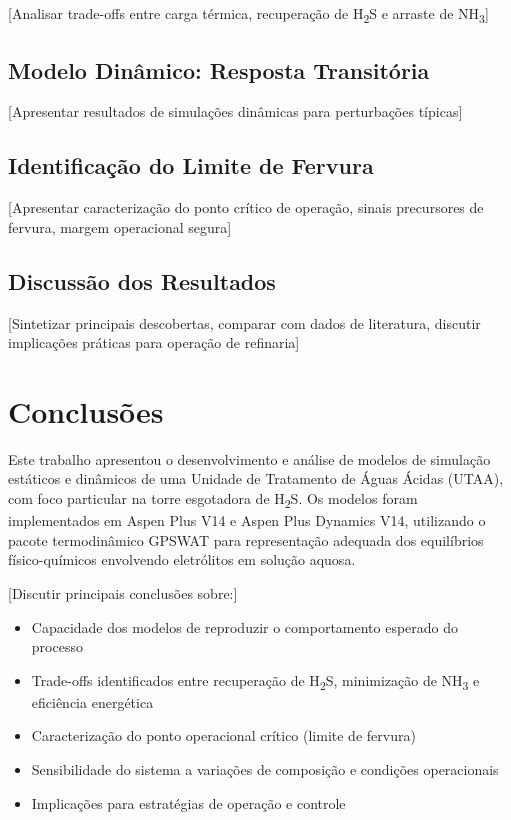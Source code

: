 [Analisar trade-offs entre carga térmica, recuperação de H\textsubscript{2}S e arraste de NH\textsubscript{3}]

\subsection{Modelo Dinâmico: Resposta Transitória}

[Apresentar resultados de simulações dinâmicas para perturbações típicas]


\subsection{Identificação do Limite de Fervura}

[Apresentar caracterização do ponto crítico de operação, sinais precursores de fervura, margem operacional segura]

\subsection{Discussão dos Resultados}

[Sintetizar principais descobertas, comparar com dados de literatura, discutir implicações práticas para operação de refinaria]

\FloatBarrier

\section{Conclusões}\label{sec:conclusoes}


Este trabalho apresentou o desenvolvimento e análise de modelos de simulação estáticos e dinâmicos de uma Unidade de Tratamento de Águas Ácidas (UTAA), com foco particular na torre esgotadora de H\textsubscript{2}S. Os modelos foram implementados em Aspen Plus V14 e Aspen Plus Dynamics V14, utilizando o pacote termodinâmico GPSWAT para representação adequada dos equilíbrios físico-químicos envolvendo eletrólitos em solução aquosa.

[Discutir principais conclusões sobre:]
\begin{itemize}[leftmargin=*]
  \item Capacidade dos modelos de reproduzir o comportamento esperado do processo
  \item Trade-offs identificados entre recuperação de H\textsubscript{2}S, minimização de NH\textsubscript{3} e eficiência energética
  \item Caracterização do ponto operacional crítico (limite de fervura)
  \item Sensibilidade do sistema a variações de composição e condições operacionais
  \item Implicações para estratégias de operação e controle
\end{itemize}

